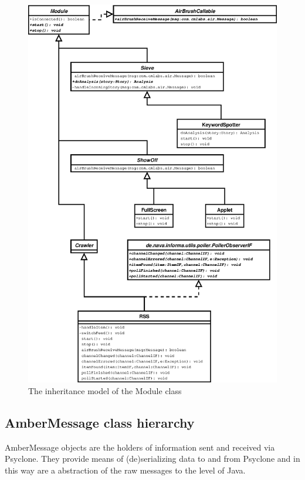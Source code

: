\begin{figure}[htp]
  \centering
  \includegraphics{image/class-diagram-module}
  \caption{
    \label{fig:class-diagram-module}
    The inheritance model of the Module class}
\end{figure}

\subsection{AmberMessage class hierarchy}

AmberMessage objects are the holders of information sent and received via
Psyclone. They provide means of (de)serializing data to and from Psyclone and
in this way are a abstraction of the raw messages to the level of Java.

